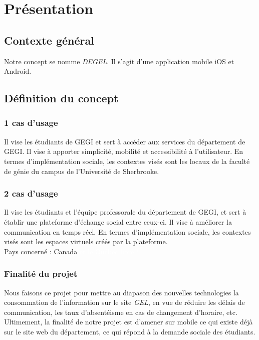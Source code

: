 \section{Présentation}
	\subsection{Contexte général}
	Notre concept se nomme \emph{DEGEL}. Il s'agit d'une application mobile iOS et Android.

	\subsection{Définition du concept}
	
		\subsubsection{1\ier{} cas d'usage} Il vise les étudiants de GEGI et sert à accéder aux services du département de GEGI. Il vise à apporter simplicité, mobilité et accessibilité à l'utilisateur. En termes d'implémentation sociale, les contextes visés sont les locaux de la faculté de génie du campus de l'Université de Sherbrooke.
		
		\subsubsection{2\ieme{} cas d'usage} Il vise les étudiants et l'équipe professorale du département de GEGI, et sert à établir une plateforme d'échange social entre ceux-ci. Il vise à améliorer la communication en temps réel. En termes d'implémentation sociale, les contextes visés sont les espaces virtuels créés par la plateforme. \\
	
			Pays concerné : Canada \textcolor{white}{et le Québec libre !}
	
		\subsubsection{Finalité du projet}
		Nous faisons ce projet pour mettre au diapason des nouvelles technologies la consommation de l'information sur le site \emph{GEL}, en vue de réduire les délais de communication, les taux d'absentéisme en cas de changement d'horaire, etc. Ultimement, la finalité de notre projet est d'amener sur mobile ce qui existe déjà sur le site web du département, ce qui répond à la demande sociale des étudiants. \\
		
